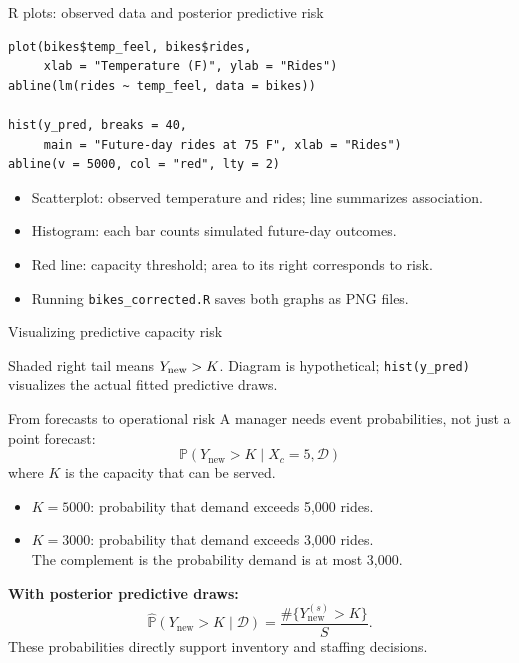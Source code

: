 \documentclass[aspectratio=43,11pt]{beamer}
\newcommand{\Prob}{\mathbb{P}}
\newcommand{\dd}{\mathcal D}
\begin{document}
\begin{frame}[fragile]{R plots: observed data and posterior predictive risk}
\scriptsize
\begin{verbatim}
plot(bikes$temp_feel, bikes$rides,
     xlab = "Temperature (F)", ylab = "Rides")
abline(lm(rides ~ temp_feel, data = bikes))

hist(y_pred, breaks = 40,
     main = "Future-day rides at 75 F", xlab = "Rides")
abline(v = 5000, col = "red", lty = 2)
\end{verbatim}
\small
\begin{itemize}
\item Scatterplot: observed temperature and rides; line summarizes association.
\item Histogram: each bar counts simulated future-day outcomes.
\item Red line: capacity threshold; area to its right corresponds to risk.
\item Running \texttt{bikes\_corrected.R} saves both graphs as PNG files.
\end{itemize}
\end{frame}

\begin{frame}{Visualizing predictive capacity risk}
\centering
{}
\par\small Shaded right tail means $Y_{\rm new}>K$. Diagram is hypothetical;
\texttt{hist(y\_pred)} visualizes the actual fitted predictive draws.
\end{frame}
\begin{frame}{From forecasts to operational risk}
A manager needs event probabilities, not just a point forecast:
\[\Prob(Y_{\mathrm{new}}>K\mid X_c=5,\dd)\]
where $K$ is the capacity that can be served.

\begin{itemize}
\item $K=5000$: probability that demand exceeds 5,000 rides.
\item $K=3000$: probability that demand exceeds 3,000 rides.\\
The complement is the probability demand is at most 3,000.
\end{itemize}
\par\medskip
\textbf{With posterior predictive draws:}
\[\widehat{\Prob}(Y_{\mathrm{new}}>K\mid\dd)=\frac{\#\{Y_{\mathrm{new}}^{(s)}>K\}}{S}.\]
These probabilities directly support inventory and staffing decisions.
\end{frame}
\end{document}
